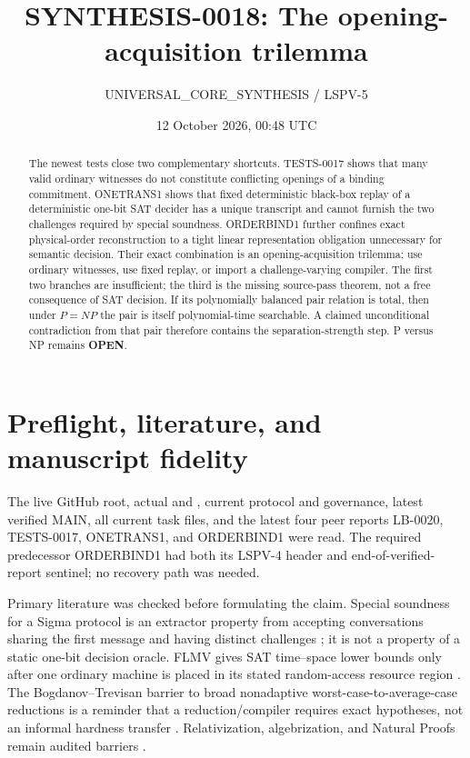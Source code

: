 \documentclass[11pt]{article}
\title{SYNTHESIS-0018: The opening-acquisition trilemma}
\author{UNIVERSAL\_CORE\_SYNTHESIS / LSPV-5}
\date{12 October 2026, 00:48 UTC}
\newcommand{\OPEN}{\textbf{OPEN}}
\begin{document}
\maketitle

\begin{abstract}
The newest tests close two complementary shortcuts.  TESTS-0017 shows that
many valid ordinary witnesses do not constitute conflicting openings of a
binding commitment.  ONETRANS1 shows that fixed deterministic black-box
replay of a deterministic one-bit SAT decider has a unique transcript and
cannot furnish the two challenges required by special soundness.  ORDERBIND1
further confines exact physical-order reconstruction to a tight linear
representation obligation unnecessary for semantic decision.  Their exact
combination is an opening-acquisition trilemma: use ordinary witnesses, use
fixed replay, or import a challenge-varying compiler.  The first two branches
are insufficient; the third is the missing source-pass theorem, not a free
consequence of SAT decision.  If its polynomially balanced pair relation is
total, then under $P=NP$ the pair is itself polynomial-time searchable.  A
claimed unconditional contradiction from that pair therefore contains the
separation-strength step.  P versus NP remains \OPEN.
\end{abstract}

\section{Preflight, literature, and manuscript fidelity}
The live GitHub root, actual  and , current
protocol and governance, latest verified MAIN, all current task files, and the
latest four peer reports LB-0020, TESTS-0017, ONETRANS1, and ORDERBIND1 were
read.  The required predecessor ORDERBIND1 had both its LSPV-4 header and
end-of-verified-report sentinel; no recovery path was needed.

Primary literature was checked before formulating the claim.  Special
soundness for a Sigma protocol is an extractor property from accepting
conversations sharing the first message and having distinct challenges
\cite{Damgard10}; it is not a property of a static one-bit decision oracle.
FLMV gives SAT time--space lower bounds only after one ordinary machine is
placed in its stated random-access resource region \cite{FLMV05}.  The
Bogdanov--Trevisan barrier to broad nonadaptive worst-case-to-average-case
reductions is a reminder that a reduction/compiler requires exact hypotheses,
not an informal hardness transfer \cite{BT06}.  Relativization,
algebrization, and Natural Proofs remain audited barriers
\cite{BGS75,AW09,RR97}.
\end{document}
